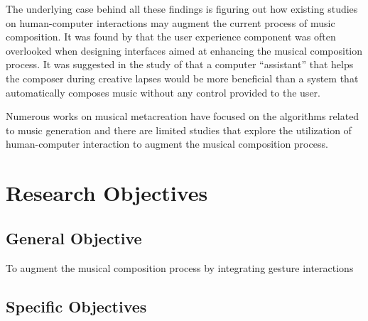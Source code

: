 

The underlying case behind all these findings is figuring out how existing studies on human-computer interactions may augment the current process of music composition. It was found by \citet{brown2017user} that the user experience component was often overlooked when designing interfaces aimed at enhancing the musical composition process. It was suggested in the study of \citep{levitt1992representation} that a computer ``assistant'' that helps the composer during creative lapses would be more beneficial than a system that automatically composes music without any control provided to the user. 

Numerous works on musical metacreation have focused on the algorithms related to music generation and there are limited studies that explore the utilization of human-computer interaction to augment the musical composition process.

\begin{comment}
Although there are already several musical composition tools that aid in the composition of music such as Hyperscore \citep{farbood2004hyperscore} and HARP \citep{camurri1991harp}, the ability to assist composers in a way that it helps them generate ideas are what these systems lack. The graphical user interface of these systems improve the overall user experience of musical composers, but the important problem still remains which is coming up with musical ideas. 
\end{comment}


   

\section{Research Objectives}
\label{sec:researchobjectives}

\subsection{General Objective}
\label{sec:generalobjective}

To augment the musical composition process by integrating gesture interactions

\subsection{Specific Objectives}
\label{sec:specificobjectives}

